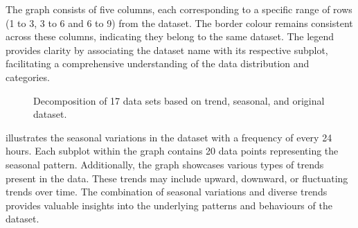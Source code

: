 \documentclass[a4paper, fleqn]{cas-sc}
\theoremstyle{definition}
\theoremstyle{remark}
\begin{document}
\begin{itemize}
The graph consists of five columns,  each corresponding to a specific range of rows (1 to 3,  3 to 6 and 6 to 9) from the dataset. The border colour remains consistent across these columns,  indicating they belong to the same dataset. The legend provides clarity by associating the dataset name with its respective subplot,  facilitating a comprehensive understanding of the data distribution and categories.


\begin{figure}[h!]
  \centering
  \caption{Decomposition of 17 data sets based on trend, seasonal, and original dataset.}
  \label{Eda}
\end{figure}
 illustrates the seasonal variations in the dataset with a frequency of every 24 hours. Each subplot within the graph contains 20 data points representing the seasonal pattern. Additionally,  the graph showcases various types of trends present in the data. These trends may include upward, downward,  or fluctuating trends over time. The combination of seasonal variations and diverse trends provides valuable insights into the underlying patterns and behaviours of the dataset.
\end{itemize}
\end{document}
